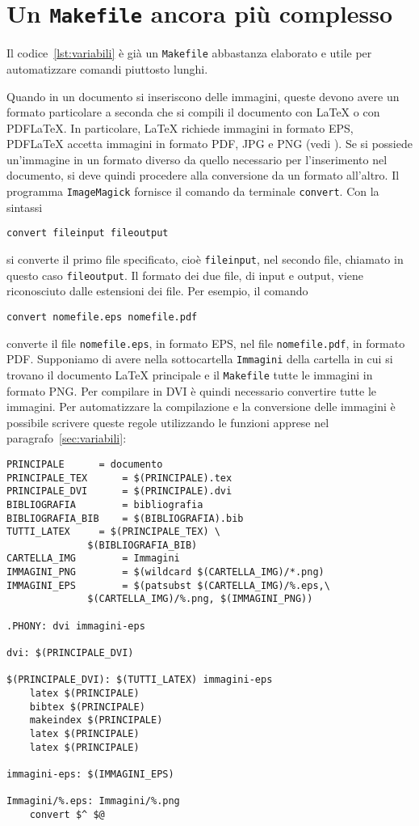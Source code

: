 \section{Un \texttt{Makefile} ancora più complesso}
Il codice~\ref{lst:variabili} è già un \verb|Makefile| abbastanza elaborato e
utile per automatizzare comandi piuttosto lunghi.

Quando in un documento si inseriscono delle immagini, queste devono avere un
formato particolare a seconda che si compili il documento con \LaTeX{}
o con \textsc{PDF}\LaTeX.  In particolare, \LaTeX{}
richiede immagini in formato \textsc{EPS}, \textsc{PDF}\LaTeX{}
accetta immagini in formato \textsc{PDF}, \textsc{JPG} e \textsc{PNG} (vedi
\textcite[105]{pantieri:latex}).  Se si possiede un'immagine in un formato
diverso da quello necessario per l'inserimento nel documento, si deve quindi
procedere alla conversione da un formato all'altro.  Il programma
\verb|ImageMagick| fornisce il comando da terminale \verb|convert|. Con la
sintassi
\begin{verbatim}
convert fileinput fileoutput
\end{verbatim}
si converte il primo file specificato, cioè \verb|fileinput|, nel secondo file,
chiamato in questo caso \verb|fileoutput|.  Il formato dei due file, di input e
output, viene riconosciuto dalle estensioni dei file.  Per esempio, il comando
\begin{verbatim}
convert nomefile.eps nomefile.pdf
\end{verbatim}
converte il file \verb|nomefile.eps|, in formato \textsc{EPS}, nel file
\verb|nomefile.pdf|, in formato \textsc{PDF}.  Supponiamo di avere nella
sottocartella \verb|Immagini| della cartella in cui si trovano il documento
\LaTeX{}
principale e il \verb|Makefile| tutte le immagini in formato \textsc{PNG}.  Per
compilare in \textsc{DVI} è quindi necessario convertire tutte le immagini.  Per
automatizzare la compilazione e la conversione delle immagini è possibile
scrivere queste regole utilizzando le funzioni apprese nel
paragrafo~\ref{sec:variabili}:
\begin{lstlisting}[caption={\texttt{Makefile} in cui le immagini \textsc{PNG}
vengono convertite in \textsc{EPS} nella compilazione con \LaTeX},label=lst:png-eps]
PRINCIPALE 		= documento
PRINCIPALE_TEX		= $(PRINCIPALE).tex
PRINCIPALE_DVI		= $(PRINCIPALE).dvi
BIBLIOGRAFIA		= bibliografia
BIBLIOGRAFIA_BIB	= $(BIBLIOGRAFIA).bib
TUTTI_LATEX		= $(PRINCIPALE_TEX) \
			  $(BIBLIOGRAFIA_BIB)
CARTELLA_IMG		= Immagini
IMMAGINI_PNG		= $(wildcard $(CARTELLA_IMG)/*.png)
IMMAGINI_EPS		= $(patsubst $(CARTELLA_IMG)/%.eps,\
			  $(CARTELLA_IMG)/%.png, $(IMMAGINI_PNG))

.PHONY: dvi immagini-eps

dvi: $(PRINCIPALE_DVI)

$(PRINCIPALE_DVI): $(TUTTI_LATEX) immagini-eps
	latex $(PRINCIPALE)
	bibtex $(PRINCIPALE)
	makeindex $(PRINCIPALE)
	latex $(PRINCIPALE)
	latex $(PRINCIPALE)

immagini-eps: $(IMMAGINI_EPS)

Immagini/%.eps: Immagini/%.png
	convert $^ $@
\end{lstlisting}
